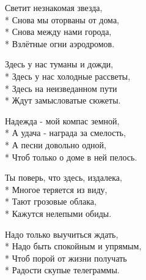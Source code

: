 \medskip

\begin{minipage}{\linewidth}
Светит незнакомая звезда, \\*
Снова мы оторваны от дома, \\*
Снова между нами города,\\*
Взлётные огни аэродромов.\\
\end{minipage}\par\medskip\nobreak

\medskip

\begin{minipage}{\linewidth}
Здесь у нас туманы и дожди,\\*
Здесь у нас холодные рассветы,\\*
Здесь на неизведанном пути\\*
Ждут замысловатые сюжеты.\\
\end{minipage}\par\medskip\nobreak

\medskip

\begin{minipage}{\linewidth}
\hspace*{1.5em}Надежда - мой компас земной,\\*
\hspace*{1.5em}А удача - награда за смелость,\\*
\hspace*{1.5em}А песни довольно одной,\\*
\hspace*{1.5em}Чтоб только о доме в ней пелось.\\
\end{minipage}\par\medskip\nobreak

\medskip

\begin{minipage}{\linewidth}
Ты поверь, что здесь, издалека,\\*
Многое теряется из виду,\\*
Тают грозовые облака,\\*
Кажутся нелепыми обиды.\\
\end{minipage}\par\medskip\nobreak

\medskip

\begin{minipage}{\linewidth}
Надо только выучиться ждать,\\*
Надо быть спокойным и упрямым,\\*
Чтоб порой от жизни получать\\*
Радости скупые телеграммы.\\
\end{minipage}\par\medskip\nobreak

